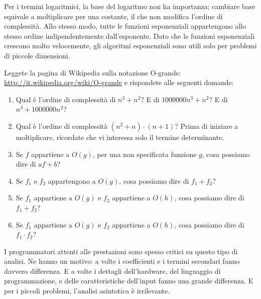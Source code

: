 \documentclass[10pt]{book}
\begin{document}
Per i termini logaritmici, la base del logaritmo non ha importanza; cambiare base equivale a moltiplicare per una costante, il che non modifica l'ordine di complessità. Allo stesso modo, tutte le funzioni esponenziali appartengono allo stesso ordine indipendentemente dall'esponente. Dato che le funzioni esponenziali crescono molto velocemente, gli algoritmi esponenziali sono utili solo per problemi di piccole dimensioni.

\vspace{0.2in}
\begin{exercise}

Leggete la pagina di Wikipedia sulla notazione O-grande: 
\url{http://it.wikipedia.org/wiki/O-grande} e rispondete alle seguenti domande:

\begin{enumerate}
\item Qual è l'ordine di complessità di $n^3 + n^2$?
E di $1000000 n^3 + n^2$?
E di $n^3 + 1000000 n^2$?

\item Qual è l'ordine di complessità $(n^2 + n) \cdot (n + 1)$?  Prima di iniziare a moltiplicare, ricordate che vi interessa solo il termine determinante.

\item Se $f$ appartiene a $O(g)$, per una non specificata funzione $g$, cosa possiamo dire di $af+b$?

\item Se $f_1$ e $f_2$ appartengono a $O(g)$, cosa possiamo dire di $f_1 + f_2$?

\item Se $f_1$ appartiene a $O(g)$
e $f_2$ appartiene a $O(h)$,
cosa possiamo dire di  $f_1 + f_2$?

\item Se  $f_1$ appartiene a $O(g)$ e $f_2$ appartiene a $O(h)$,
cosa possiamo dire di  $f_1 \cdot f_2$?
\end{enumerate}

\end{exercise}

I programmatori attenti alle prestazioni sono spesso critici su questo tipo di analisi. Ne hanno un motivo: a volte i coefficienti e i termini secondari fanno davvero differenza. E a volte i dettagli dell'hardware, del linguaggio di programmazione, e delle caratteristiche dell'input fanno una grande differenza. E per i piccoli problemi, l'analisi asintotica è irrilevante.
\end{document}
